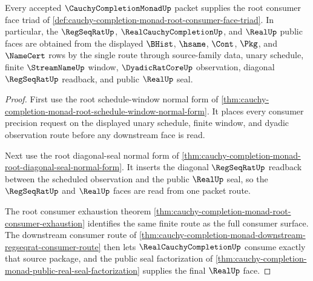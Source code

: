 \begin{theorem}
\label{thm:cauchy-completion-monad-root-face-coverage}
Every accepted $\CauchyCompletionMonadUp$ packet supplies the root consumer face triad of \autoref{def:cauchy-completion-monad-root-consumer-face-triad}. In particular, the $\RegSeqRatUp$, $\RealCauchyCompletionUp$, and $\RealUp$ public faces are obtained from the displayed $\BHist$, $\hsame$, $\Cont$, $\Pkg$, and $\NameCert$ rows by the single route through source-family data, unary schedule, finite $\StreamNameUp$ window, $\DyadicRatCoreUp$ observation, diagonal $\RegSeqRatUp$ readback, and public $\RealUp$ seal.
\end{theorem}
\begin{proof}
First use the root schedule-window normal form of \autoref{thm:cauchy-completion-monad-root-schedule-window-normal-form}. It places every consumer precision request on the displayed unary schedule, finite window, and dyadic observation route before any downstream face is read.

Next use the root diagonal-seal normal form of \autoref{thm:cauchy-completion-monad-root-diagonal-seal-normal-form}. It inserts the diagonal $\RegSeqRatUp$ readback between the scheduled observation and the public $\RealUp$ seal, so the $\RegSeqRatUp$ and $\RealUp$ faces are read from one packet route.

The root consumer exhaustion theorem \autoref{thm:cauchy-completion-monad-root-consumer-exhaustion} identifies the same finite route as the full consumer surface. The downstream consumer route of \autoref{thm:cauchy-completion-monad-downstream-regseqrat-consumer-route} then lets $\RealCauchyCompletionUp$ consume exactly that source package, and the public seal factorization of \autoref{thm:cauchy-completion-monad-public-real-seal-factorization} supplies the final $\RealUp$ face.
\end{proof}


